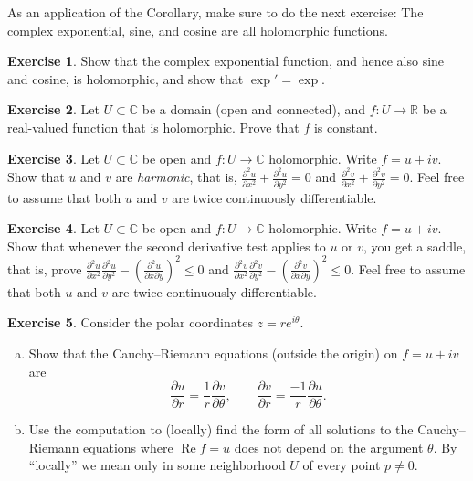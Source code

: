 \documentclass[12pt,openany]{book}
\renewcommand{\Re}{\operatorname{Re}}
\newcommand{\C}{{\mathbb{C}}}
\newcommand{\R}{{\mathbb{R}}}
\newcommand{\myindex}[1]{#1\index{#1}}
\newcommand{\myquote}[1]{``#1''}
\theoremstyle{plain}
\theoremstyle{remark}
\theoremstyle{definition}
\newenvironment{exbox}{%
    \def\FrameCommand{\vrule width 1pt \relax\hspace{10pt}}%
    \MakeFramed{\advance\hsize-\width\FrameRestore}%
}{%
    \endMakeFramed
}
\newenvironment{exparts}{%
    \leavevmode\begin{enumerate}[a),noitemsep,topsep=0pt,parsep=0pt,partopsep=0pt]
}{%
    \end{enumerate}
}
\theoremstyle{exercise}
\newtheorem{exercise}{Exercise}[section]
\theoremstyle{example}
\begin{document}
As an application of the Corollary,
make sure to do the next exercise: The complex exponential,
sine, and cosine are all holomorphic functions.

\begin{exbox}
\begin{exercise} \label{exercise:exponentialholomorphic}
Show that the complex exponential function, and hence also sine and cosine,
is holomorphic, and show that $\exp' = \exp$.
\end{exercise}

\begin{exercise}
Let $U \subset \C$ be a domain (open and connected),
and $f \colon U \to \R$ be a real-valued function that is holomorphic.
Prove that $f$ is constant.
\end{exercise}

\begin{exercise}
Let $U \subset \C$ be open and $f \colon U \to \C$ holomorphic.
Write $f = u+iv$.  Show that $u$ and $v$ are \emph{\myindex{harmonic}},
that is,
$\frac{\partial^2 u}{\partial x^2} +  \frac{\partial^2 u}{\partial y^2} = 0$
and
$\frac{\partial^2 v}{\partial x^2} +  \frac{\partial^2 v}{\partial y^2} = 0$.
Feel free to assume that both $u$ and $v$ are twice continuously
differentiable.
\end{exercise}

\begin{exercise}
Let $U \subset \C$ be open and $f \colon U \to \C$ holomorphic.
Write $f = u+iv$.  Show that whenever the second derivative test applies 
to $u$ or $v$, you get a saddle, that is, prove
$\frac{\partial^2 u}{\partial x^2} \frac{\partial^2 u}{\partial y^2}
-{\left(\frac{\partial^2 u}{\partial x \partial y}\right)}^2 \leq 0$
and
$\frac{\partial^2 v}{\partial x^2} \frac{\partial^2 v}{\partial y^2}
-{\left(\frac{\partial^2 v}{\partial x \partial y}\right)}^2 \leq 0$.
Feel free to assume that both $u$ and $v$ are twice continuously
differentiable.
\end{exercise}

\begin{exercise}
Consider the polar coordinates $z = r e^{i\theta}$.
\begin{exparts}
\item
Show that 
the Cauchy--Riemann equations (outside the origin) on $f=u+iv$ are
\begin{equation*}
\frac{\partial u}{\partial r} = \frac{1}{r} \frac{\partial v}{\partial \theta},
\qquad
\frac{\partial v}{\partial r} = \frac{-1}{r} \frac{\partial u}{\partial \theta}.
\end{equation*}
\item
Use the computation to (locally) find the form of all solutions to 
the Cauchy--Riemann equations where $\Re f = u$ does not depend on the
argument $\theta$.  By \myquote{locally} we mean only in some neighborhood $U$ of
every point $p \not= 0$.
\end{exparts}
\end{exercise}
\end{exbox}
\end{document}
